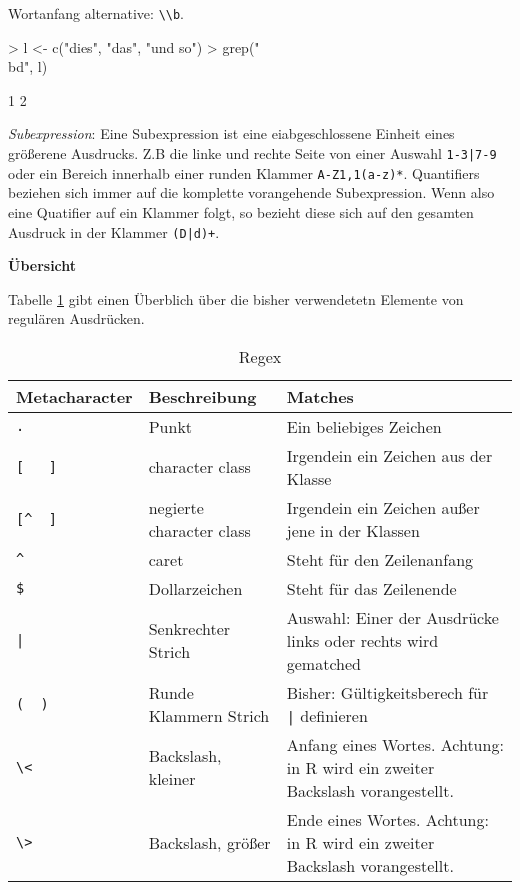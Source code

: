 \documentclass[a4paper]{report}
\newcommand{\R}{{\sffamily R}}
\begin{document}
Wortanfang alternative: \verb!\\b!.
\begin{Schunk}
\begin{Sinput}
> l <- c("dies", "das", "und so")
> grep("\\bd", l)
\end{Sinput}
\begin{Soutput}
[1] 1 2
\end{Soutput}
\end{Schunk}
 
\emph{Subexpression}: Eine Subexpression ist eine eiabgeschlossene Einheit eines größerene Ausdrucks. Z.B die linke und rechte Seite von einer Auswahl \texttt{1-3|7-9} oder ein Bereich innerhalb einer runden Klammer \texttt{A-Z{1,1}(a-z)*}. Quantifiers beziehen sich immer auf die komplette vorangehende Subexpression. Wenn also eine Quatifier auf ein Klammer folgt, so bezieht diese sich auf den gesamten Ausdruck in der Klammer \texttt{(D|d)+}.



\textbf{Übersicht}

Tabelle \ref{tab:regex} gibt einen Überblich über die bisher verwendetetn Elemente von regulären Ausdrücken.

\begin{table}[htb]
  \centering
  \caption[]{Regex}
  \label{tab:regex}
\begin{scriptsize}
\begin{tabular}{p{2cm}p{3.5cm}p{8cm}}
\hline
Metacharacter & Beschreibung & Matches\\
\hline
\verb!.!      & Punkt & Ein beliebiges Zeichen \\
\verb![   ]!  & character class & Irgendein ein Zeichen aus der Klasse \\  
\verb![^  ]!  & negierte character class & Irgendein ein Zeichen außer jene in der Klassen \\
\verb!^!      & caret & Steht für den Zeilenanfang \\
\verb!$!      & Dollarzeichen & Steht für das Zeilenende \\
\verb!|!      & Senkrechter Strich & Auswahl: Einer der Ausdrücke links oder rechts wird gematched \\                       
\verb!(  )!   & Runde Klammern Strich & Bisher: Gültigkeitsberech für \verb! |! definieren \\  
\verb!\<!    & Backslash, kleiner & Anfang eines Wortes. Achtung: in \R{} wird ein zweiter Backslash vorangestellt. \\  
\verb!\>!    & Backslash, größer & Ende eines Wortes. Achtung: in \R{} wird ein zweiter Backslash vorangestellt. \\  
\hline
\end{tabular}
\end{scriptsize}
\end{table}
\end{document}
